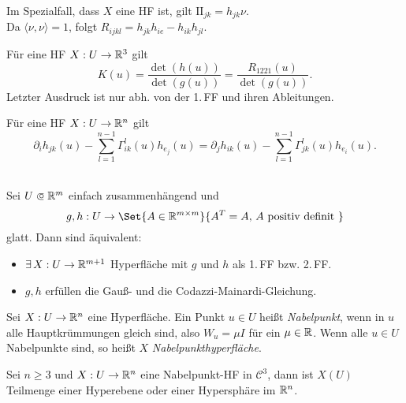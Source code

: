 \documentclass{cheat-sheet}
\newcommand{\FFII}{\mathrm{I\!I}} %
\newcommand{\Cont}{\mathcal{C}} %
\begin{document}
\begin{bem}
  Im Spezialfall, dass $X$ eine HF ist, gilt $\FFII_{jk} = h_{jk} \nu$.\\
  Da $\langle \nu, \nu \rangle = 1$, folgt $R_{ijkl} = h_{jk} h_{ie} - h_{ik} h_{jl}$.
\end{bem}

\begin{satz}
  Für eine HF $X : U \to \mathbb{R}^3$ gilt
  \[ K(u) = \frac{\det(h(u))}{\det(g(u))} = \frac{R_{1221}(u)}{\det(g(u))}. \]
  Letzter Ausdruck ist nur abh. von der 1.\,FF und ihren Ableitungen.
\end{satz}


\begin{satz}
  Für eine HF $X : U \to \mathbb{R}^n$ gilt
  \[ \partial_i h_{jk}(u) - \sum_{l=1}^{n-1} \Gamma_{ik}^l(u) h_{e_j}(u) = \partial_j h_{ik}(u) - \sum_{l=1}^{n-1} \Gamma_{jk}^l(u) h_{e_i}(u). \]
\end{satz}

\begin{satz}\mbox{}\\
  Sei $U \opn \R^m$ einfach zusammenhängend und
  \[ g, h : U \to \Set{ A \in \R^{m \times m} }{ A^T = A, \, A \text{ positiv definit } } \]
  glatt. Dann sind äquivalent:
  \begin{itemize}
    \item $\exists \, X : U \to \mathbb{R}^{m+1}$ Hyperfläche mit $g$ und $h$ als 1.\,FF bzw. 2.\,FF.
    \item $g, h$ erfüllen die Gauß- und die Codazzi-Mainardi-Gleichung.
  \end{itemize}
\end{satz}



\begin{defn}
  Sei $X : U \to \mathbb{R}^n$ eine Hyperfläche. Ein Punkt $u \in U$ heißt \emph{Nabelpunkt}, wenn in $u$ alle Hauptkrümmungen gleich sind, also $W_u = \mu I$ für ein $\mu \in \mathbb{R}$. Wenn alle $u \in U$ Nabelpunkte sind, so heißt $X$ \emph{Nabelpunkthyperfläche}.
\end{defn}

\begin{satz}
  Sei $n \geq 3$ und $X : U \to \mathbb{R}^n$ eine Nabelpunkt-HF in $\Cont^3$, dann ist $X(U)$ Teilmenge einer Hyperebene oder einer Hypersphäre im $\mathbb{R}^n$.
\end{satz}
\end{document}
